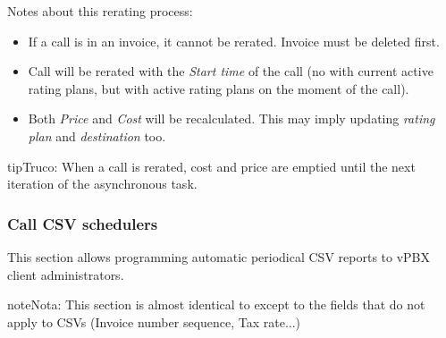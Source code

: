 \documentclass[letterpaper,10pt,spanish]{sphinxmanual}
\begin{document}
Notes about this rerating process:
\begin{itemize}
\item {} 
If a call is in an invoice, it cannot be rerated. Invoice must be deleted first.

\item {} 
Call will be rerated with the \emph{Start time} of the call (no with current active rating plans, but with active rating plans
on the moment of the call).

\item {} 
Both \emph{Price} and \emph{Cost} will be recalculated. This may imply updating \emph{rating plan} and \emph{destination} too.

\end{itemize}

\begin{notice}{tip}{Truco:}
When a call is rerated, cost and price are emptied until the next iteration of the asynchronous task.
\end{notice}


\subsubsection{Call CSV schedulers}
\label{administration_portal/client/vpbx/calls/call_csv_schedulers:call-csv-schedulers}\label{administration_portal/client/vpbx/calls/call_csv_schedulers::doc}
This section allows programming automatic periodical CSV reports to vPBX client administrators.

\begin{notice}{note}{Nota:}
This section is almost identical to {\hyperref[administration_portal/brand/invoicing/invoice_schedulers:invoice\string-schedulers]{}} except to the
fields that do not apply to CSVs (Invoice number sequence, Tax rate...)
\end{notice}
\end{document}

